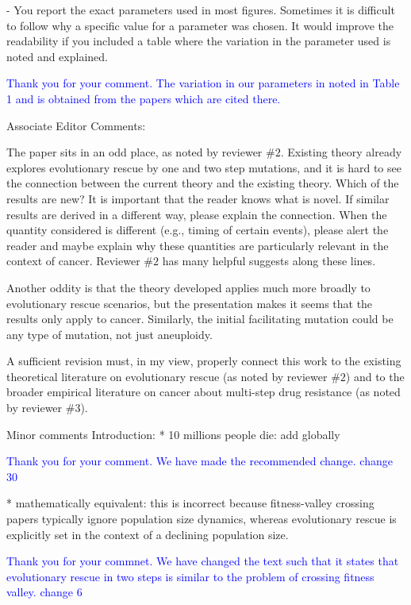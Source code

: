 \documentclass[11pt,a4paper]{article}
\begin{document}
- You report the exact parameters used in most figures. Sometimes it is difficult to follow why a specific value for a parameter was chosen. It would improve the readability if you included a table where the variation in the parameter used is noted and explained.

\textcolor{blue}{Thank you for your comment. The variation in our parameters in noted in Table 1 and is obtained from the papers which are cited there.} 

Associate Editor Comments:

The paper sits in an odd place, as noted by reviewer $\#2$. Existing theory already explores evolutionary rescue by one and two step mutations, and it is hard to see the connection between the current theory and the existing theory. Which of the results are new? It is important that the reader knows what is novel. If similar results are derived in a different way, please explain the connection. When the quantity considered is different (e.g., timing of certain events), please alert the reader and maybe explain why these quantities are particularly relevant in the context of cancer. Reviewer $\#2$ has many helpful suggests along these lines.

Another oddity is that the theory developed applies much more broadly to evolutionary rescue scenarios, but the presentation makes it seems that the results only apply to cancer. Similarly, the initial facilitating mutation could be any type of mutation, not just aneuploidy.

A sufficient revision must, in my view, properly connect this work to the existing theoretical literature on evolutionary rescue (as noted by reviewer $\#2$) and to the broader empirical literature on cancer about multi-step drug resistance (as noted by reviewer $\#3$).

Minor comments
Introduction:
* 10 millions people die: add globally

\textcolor{blue}{Thank you for your comment. We have made the recommended change. change 30} 

* mathematically equivalent: this is incorrect because fitness-valley crossing papers typically ignore population size dynamics, whereas evolutionary rescue is explicitly set in the context of a declining population size.

\textcolor{blue}{Thank you for your commnet. We have changed the text such that it states that evolutionary rescue in two steps is similar to the problem of crossing fitness valley. change 6} 
\end{document}
